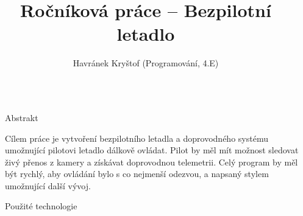 \documentclass[final]{beamer}
\title{Ročníková práce -- Bezpilotní letadlo}
\author{Havránek Kryštof (Programování, 4.E)}
\institute[shortinst]{Gymnázium, Praha 6, Arabská 14}
\newlength{\sepwidth}
\newlength{\colwidth}
\newcommand{\separatorcolumn}{\begin{column}{\sepwidth}\end{column}}
\begin{document}
\begin{frame}[t]
  \begin{columns}[t]
    \separatorcolumn

    \begin{column}{\colwidth}

      \begin{block}{Abstrakt}

        Cílem práce je vytvoření bezpilotního letadla a doprovodného systému umožnující pilotovi letadlo dálkově ovládat.
        Pilot by měl mít možnost sledovat živý přenos z kamery a získávat doprovodnou telemetrii.
        Celý program by měl být rychlý, aby ovládání bylo s co nejmenší odezvou, a napsaný stylem umožnující další vývoj.

      \end{block}

      \begin{block}{Použité technologie}


\end{block}
\end{column}
\end{columns}
\end{frame}
\end{document}
